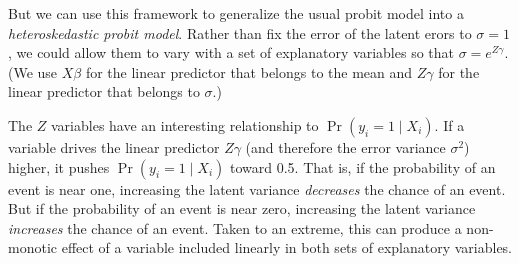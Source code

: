 \documentclass[
]{book}
\begin{document}
But we can use this framework to generalize the usual probit model into a \emph{heteroskedastic probit model}. Rather than fix the error of the latent erors to \(\sigma = 1\), we could allow them to vary with a set of explanatory variables so that \(\sigma = e^{Z\gamma}\). (We use \(X\beta\) for the linear predictor that belongs to the mean and \(Z\gamma\) for the linear predictor that belongs to \(\sigma\).)

The \(Z\) variables have an interesting relationship to \(\Pr(y_i = 1 \mid X_i)\). If a variable drives the linear predictor \(Z\gamma\) (and therefore the error variance \(\sigma^2\)) higher, it pushes \(\Pr(y_i = 1 \mid X_i)\) toward 0.5. That is, if the probability of an event is near one, increasing the latent variance \emph{decreases} the chance of an event. But if the probability of an event is near zero, increasing the latent variance \emph{increases} the chance of an event. Taken to an extreme, this can produce a non-monotic effect of a variable included linearly in both sets of explanatory variables.
\end{document}
